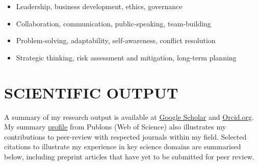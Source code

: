 \documentclass[
  letterpaper,
  DIV=11,
  numbers=noendperiod]{scrartcl}
\providecommand{\tightlist}{%
  \setlength{\itemsep}{0pt}\setlength{\parskip}{0pt}}\usepackage{longtable,booktabs,array}
\begin{document}
\begin{itemize}
\tightlist
\item
  Leadership, business development, ethics, governance
\item
  Collaboration, communication, public-speaking, team-building
\item
  Problem-solving, adaptability, self-awareness, conflict resolution
\item
  Strategic thinking, risk assessment and mitigation, long-term planning
\end{itemize}

\section{SCIENTIFIC OUTPUT}\label{scientific-output}

A summary of my research output is available at
\href{https://scholar.google.com.au/citations?user=PKsLEVQAAAAJ&hl=en}{Google
Scholar} and \href{https://orcid.org/0000-0001-6592-0738}{Orcid.org}. My
summary
\href{https://drive.google.com/file/d/1-3km47uPpoYbxgskkXc6kdgOhtD2Pk5U/view?usp=sharing}{profile}
from Publons (Web of Science) also illustrates my contributions to
peer-review with respected journals within my field. Selected citations
to illustrate my experience in key science domains are summarised below,
including preprint articles that have yet to be submitted for peer
review.
\end{document}
